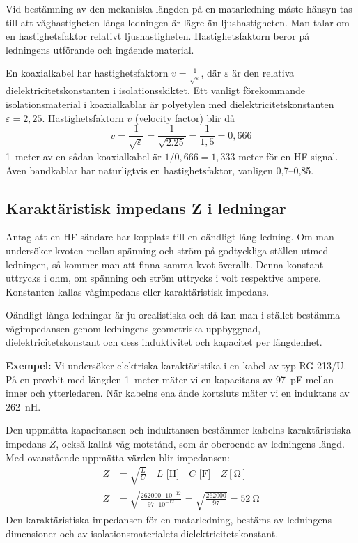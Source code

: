 Vid bestämning av den mekaniska längden på en matarledning måste hänsyn tas
till att våghastigheten längs ledningen är lägre än ljushastigheten.
Man talar om en hastighetsfaktor relativt ljushastigheten.
Hastighetsfaktorn beror på ledningens utförande och ingående material.

En koaxialkabel har hastighetsfaktorn \(v = \frac{1}{\sqrt{\varepsilon}}\),
där \(\varepsilon\) är den relativa dielektricitetskonstanten i
isolationsskiktet.
Ett vanligt förekommande isolationsmaterial i koaxialkablar är polyetylen med
dielektricitetskonstanten \(\varepsilon = 2,25\).
Hastighetsfaktorn \(v\) (velocity factor) blir då
\[
v = \frac{1}{\sqrt{\varepsilon}} = \frac{1}{\sqrt{2.25}} = \frac{1}{1,5} = 0,666
\]
1~meter av en sådan koaxialkabel är \(1/0,666 = 1,333\) meter för en HF-signal.
Även bandkablar har naturligtvis en hastighetsfaktor, vanligen 0,7--0,85.

\newpage %

\subsection{Karaktäristisk impedans Z i led\-ningar}

Antag att en HF-sändare har kopplats till en oändligt lång ledning.
Om man undersöker kvoten mellan spänning och ström på godtyckliga ställen
utmed ledningen, så kommer man att finna samma kvot överallt.
Denna konstant uttrycks i ohm, om spänning och ström uttrycks i volt
respektive ampere.
Konstanten kallas vågimpedans eller karaktäristisk impedans.

Oändligt långa ledningar är ju orealistiska och då kan man i stället bestämma
vågimpedansen genom ledningens geometriska uppbyggnad, dielektricitetskonstant
och dess induktivitet och kapacitet per längdenhet.

\noindent\textbf{Exempel:}
Vi undersöker elektriska karaktäristika i en kabel av typ RG-213/U.
På en provbit med längden 1~meter mäter vi en kapacitans av \SI{97}{\pico\farad}
mellan inner och ytterledaren.
När kabelns ena ände kortsluts mäter vi en induktans av \SI{262}{\nano\henry}.

Den uppmätta kapacitansen och induktansen bestämmer kabelns karaktäristiska
impedans \(Z\), också kallat våg motstånd, som är oberoende av ledningens längd.
Med ovanstående uppmätta värden blir impedansen:
\begin{align*}
  Z &= \sqrt{\frac{L}{C}} \quad L\text{ [H]} \quad C\text{ [F]} \quad
  Z [\si{\ohm}] \\
  Z &= \sqrt{\frac{262000\cdot 10^{-12}}{97\cdot 10^{-12}}} =
  \sqrt{\frac{262000}{97}} = \SI{52}{\ohm}
\end{align*}
Den karaktäristiska impedansen för en matarledning, bestäms av ledningens
dimensioner och av isolationsmaterialets dielektricitetskonstant.

